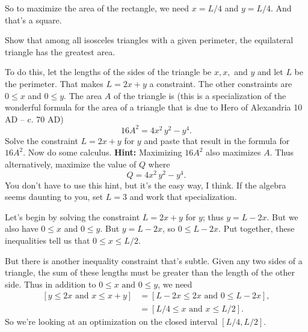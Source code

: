 \documentclass[12pt,fleqn,answers]{exam}
\begin{document}
\begin{questions}
\begin{solution}
     \quad So to maximize the area of the rectangle, we need $x = L/4$ and $y = L/4$. And that's a square.
     
     \end{solution}


    \question [5] Show that among all isosceles triangles with a given
    perimeter, the equilateral triangle has the greatest area.

    \quad To do this, let the lengths of the sides of the triangle be $x,x,$
    and $y$ and let $L$ be the perimeter. That makes $L = 2 x + y$ a
    constraint. The other constraints are $0 \leq x$ and $0 \leq y$.
    The area $A$ of the triangle is (this is a specialization of 
    the wonderful formula for the area of a triangle that is due to Hero of Alexandria 
    10 AD – c. 70 AD)
    \begin{equation*}
        16 {{A}^{2}}=4 {{x}^{2}}\, {{y}^{2}}-{{y}^{4}}.
    \end{equation*}
    Solve the constraint $L = 2 x + y$ for $y$ and paste that
    result in  the formula for $16 A^2$. Now do some calculus.
    \textbf{Hint:} Maximizing $16 A^2$ also maximizes $A$.  Thus
    alternatively, maximize the value of $Q$ where
    \begin{equation*}
        Q =4 {{x}^{2}}\, {{y}^{2}}-{{y}^{4}}.
    \end{equation*}
    You
    don't have to use this hint, but it's the easy way, I think.
    \quad If the algebra seems daunting to you, set $L = 3$ and work
    that specialization. 


   \begin{solution}
   Let's begin by solving the constraint  $L = 2 x + y$ for $y$; thus  $y = L - 2 x$.  
   But we also have $0 \leq x$ and $0 \leq y$.  But $y = L - 2 x$, so 
   $0 \leq L - 2x$. Put together, these inequalities tell us that
   $0 \leq x \leq L/2$. 

   \quad But there is another inequality constraint that's subtle. 
   Given any two sides of a triangle, the sum of these lengths must
   be greater than the length of the other side. Thus   
   in addition to $0 \leq x  \mbox { and  } 0 \leq y$, we need
   \begin{align*}
     \left [y \leq 2 x \mbox { and  } x  \leq x + y \right ]
     &= \left [  L - 2 x \leq 2 x \mbox { and  }  0 \leq L -  2x  \right ], \\
     &= \left [  L / 4 \leq x  \mbox { and  } x \leq L / 2 \right ]. 
   \end{align*} 
So we're looking at an optimization on the closed interval $[L/4, L/2]$.
   

\end{solution}
\end{questions}
\end{document}

